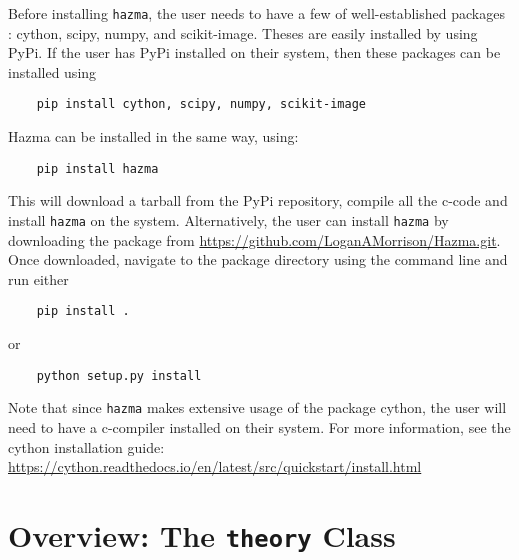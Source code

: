 Before installing \texttt{hazma}, the user needs to have a few of well-established packages : cython, scipy, numpy, and scikit-image. Theses are easily installed by using PyPi. If the user has PyPi installed on their system, then these packages can be installed using
\begin{verbatim}
	pip install cython, scipy, numpy, scikit-image
\end{verbatim}
Hazma can be installed in the same way, using:
\begin{verbatim}
	pip install hazma
\end{verbatim}
This will download a tarball from the PyPi repository, compile all the c-code and install \texttt{hazma} on the system. Alternatively, the user can install \texttt{hazma} by downloading the package from \url{https://github.com/LoganAMorrison/Hazma.git}. Once downloaded, navigate to the package directory using the command line and run either
\begin{verbatim}
	pip install .
\end{verbatim}
or
\begin{verbatim}
	python setup.py install
\end{verbatim}


Note that since \texttt{hazma} makes extensive usage of the package cython, the user will need to have a c-compiler installed on their system. For more information, see the cython installation guide: \url{https://cython.readthedocs.io/en/latest/src/quickstart/install.html}




\section{Overview: The \texttt{theory} Class}%
\label{sec:overview_the_theory_class}



